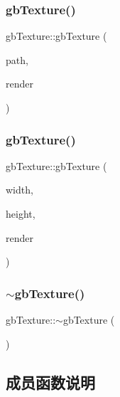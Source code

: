 \subsubsection{\texorpdfstring{gbTexture()}{gbTexture()}\hspace{0.1cm}{\footnotesize\ttfamily [2/3]}}
{\footnotesize\ttfamily gb\+Texture\+::gb\+Texture (\begin{DoxyParamCaption}\item[{const string}]{path,  }\item[{S\+D\+L\+\_\+\+Renderer $\ast$}]{render }\end{DoxyParamCaption})}

\mbox{\label{classgb_texture_a2ee6447c6deb2f8559a949b48b9286de}} 
\subsubsection{\texorpdfstring{gbTexture()}{gbTexture()}\hspace{0.1cm}{\footnotesize\ttfamily [3/3]}}
{\footnotesize\ttfamily gb\+Texture\+::gb\+Texture (\begin{DoxyParamCaption}\item[{int}]{width,  }\item[{int}]{height,  }\item[{S\+D\+L\+\_\+\+Renderer $\ast$}]{render }\end{DoxyParamCaption})}

\mbox{\label{classgb_texture_a62b97255ac111f4227852e7a0594bc23}} 
\subsubsection{\texorpdfstring{$\sim$gbTexture()}{~gbTexture()}}
{\footnotesize\ttfamily gb\+Texture\+::$\sim$gb\+Texture (\begin{DoxyParamCaption}{ }\end{DoxyParamCaption})}



\subsection{成员函数说明}
\mbox{\label{classgb_texture_af3065e3816833d038f9bf37af2f46306}} 
